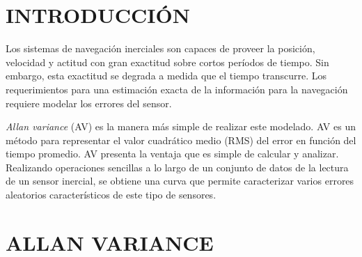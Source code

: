 \documentclass[a4paper,11pt,twoside]{IT-CNEA}
\begin{document}
    \tableofcontents       
    \printnomenclature[2cm]

\newpage  
\section{INTRODUCCIÓN}
Los sistemas de navegación inerciales son capaces de proveer la posición, velocidad y actitud con
gran exactitud sobre cortos períodos de tiempo. Sin embargo, esta exactitud se degrada a medida que el
tiempo transcurre. Los requerimientos para una estimación exacta de la información para la navegación
requiere modelar los errores del sensor.
\par \textit{Allan variance} (AV) es la manera más simple de realizar este modelado. AV es un método para
representar el valor cuadrático medio (RMS) del error en función del tiempo promedio.
AV presenta la ventaja que es simple de calcular y analizar. Realizando operaciones sencillas a lo largo
de un conjunto de datos de la lectura de un sensor inercial, se obtiene una curva que permite caracterizar varios
errores aleatorios característicos de este tipo de sensores.
\section{ALLAN VARIANCE}
\end{document}
